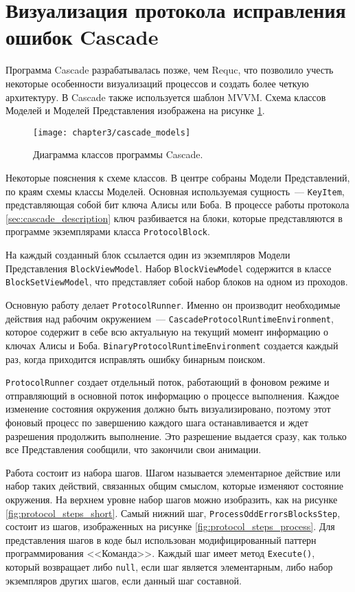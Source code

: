\section{Визуализация протокола исправления ошибок Cascade}
Программа Cascade разрабатывалась позже, чем Requc, что позволило учесть некоторые особенности визуализаций процессов и создать более четкую архитектуру.
В Cascade также используется шаблон MVVM. Схема классов Моделей и Моделей Представления изображена на рисунке \ref{fig:cascade_models}.
\begin{figure}[h]
  \texttt{[image: chapter3/cascade\_models]}
  \caption{Диаграмма классов программы Cascade.}
  \label{fig:cascade_models}
\end{figure}

Некоторые пояснения к схеме классов. В центре собраны Модели Представлений, по краям схемы классы Моделей.
Основная используемая сущность~--- \texttt{KeyItem}, представляющая собой бит ключа Алисы или Боба.
В процессе работы протокола \ref{sec:cascade_description} ключ разбивается на блоки, которые представляются в программе экземплярами класса \texttt{ProtocolBlock}.

На каждый созданный блок ссылается один из экземпляров Модели Представления \texttt{BlockViewModel}. Набор \texttt{BlockViewModel} содержится в классе \texttt{BlockSetViewModel}, что представляет собой набор блоков на одном из проходов. 

Основную работу делает \texttt{ProtocolRunner}. Именно он производит необходимые действия над рабочим окружением~--- \texttt{CascadeProtocolRuntimeEnvironment}, которое содержит в себе всю актуальную на текущий момент информацию о ключах Алисы и Боба. \texttt{BinaryProtocolRuntimeEnvironment} создается каждый раз, когда приходится исправлять ошибку бинарным поиском.

\texttt{ProtocolRunner} создает отдельный поток, работающий в фоновом режиме и отправляющий в основной поток информацию о процессе выполнения. Каждое изменение состояния окружения должно быть визуализировано, поэтому этот фоновый процесс по завершению каждого шага останавливается и ждет разрешения продолжить выполнение. Это разрешение выдается сразу, как только все Представления сообщили, что закончили свои анимации. 

Работа состоит из набора шагов. Шагом называется элементарное действие или набор таких действий, связанных общим смыслом, которые изменяют состояние окружения. 
На верхнем уровне набор шагов можно изобразить, как на рисунке \ref{fig:protocol_steps_short}. Самый нижний шаг, \texttt{ProcessOddErrorsBlocksStep}, состоит из шагов, изображенных на рисунке \ref{fig:protocol_steps_process}. Для представления шагов в коде был использован модифицированный паттерн программирования <<Команда>>. Каждый шаг имеет метод \texttt{Execute()}, который возвращает либо \texttt{null}, если шаг является элементарным, либо набор экземпляров других шагов, если данный шаг составной. 



